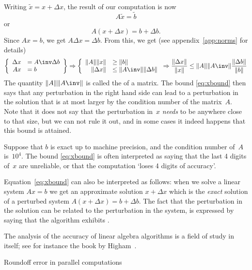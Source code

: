 Writing $\tilde x= x+\Delta x$, the result of our computation is now
\begin{equation}
  A\tilde x = \tilde b
\end{equation}
or 
\begin{equation}
  A(x+\Delta x)=b+\Delta b.
\end{equation}
Since $Ax=b$, we get $A\Delta x=\Delta b$. From this, we get
(see appendix~\ref{app:norms} for details)
\begin{equation}
 \left \{
\begin{array}{rl}
  \Delta x&=A\inv \Delta b\\ Ax&=b
\end{array} \right\} \Rightarrow \left\{
\begin{array}{rl}
  \|A\| \|x\|&\geq\|b\| \\ \|\Delta x\|&\leq \|A\inv\| \|\Delta b\|
\end{array} \right.
\Rightarrow
\frac{\|\Delta x\|}{\|x\|}
\leq 
\|A\| \|A\inv\| \frac{\|\Delta b\|}{\|b\|}
    \label{eq:xbound}
\end{equation}
The quantity $\|A\| \|A\inv\|$ is called the
 of a matrix.
The bound \eqref{eq:xbound} then says that any
perturbation in the right hand side can lead to a perturbation in the
solution that is at most larger by the condition number of the
matrix~$A$. Note that it does not say that the perturbation in~$x$
\emph{needs} to be anywhere close to that size, but we can not rule it
out, and in some cases it indeed happens that this bound is attained.

Suppose that $b$ is exact up to machine precision, and the
condition number of~$A$ is~$10^4$. The bound \eqref{eq:xbound} is
often interpreted as saying that the last 4 digits of~$x$ are
unreliable, or that the computation `loses 4 digits of accuracy'.

Equation~\eqref{eq:xbound} can also be interpreted as follows: when we
solve a linear system $Ax=b$ we get an approximate solution $x+\Delta
x$ which is the \emph{exact} solution of a perturbed system
$A(x+\Delta x)=b+\Delta b$. The fact that the perturbation in the
solution can be related to the perturbation in the system, is
expressed by saying that the algorithm exhibits .

The analysis of the accuracy of linear algebra algorithms is a field
of study in itself; see for instance the book by
Higham~\cite{Higham:2002:ASN}.

 {Roundoff error in parallel computations}
\label{sec:roundoff-parallel}

